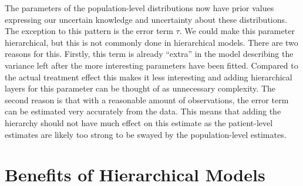 \documentclass[12pt,a4paper,leqno]{report}
\theoremstyle{plain}
\theoremstyle{definition}
\theoremstyle{remark}
\begin{document}
The parameters of the population-level distributions now have prior values expressing our
uncertain knowledge and uncertainty about these distributions. The exception to this pattern is the error
term \(\tau \). We could make this parameter hierarchical, but this is not commonly done in hierarchical models. There are
two reasons for this. Firstly, this term is already ``extra'' in the model describing
the variance left after the more interesting parameters have been fitted. Compared to the actual
treatment effect this makes it less interesting and adding hierarchical layers for this
parameter can be thought of as unnecessary complexity. The second reason is that with a
reasonable amount of observations, the error term can be estimated very accurately from
the data. This means that adding the hierarchy should not have much effect on this estimate as the
patient-level estimates are likely too strong to be swayed by the population-level
estimates.

\section{Benefits of Hierarchical Models}
\end{document}
